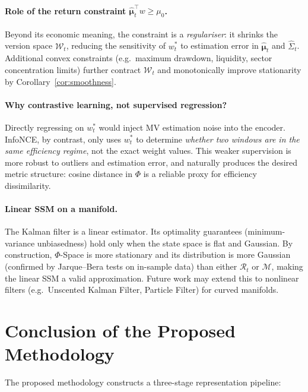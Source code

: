 \documentclass[12pt, a4paper]{report}
\theoremstyle{plain}
\theoremstyle{definition}
\newcommand{\calM}{\mathcal{M}}
\newcommand{\calR}{\mathcal{R}}
\newcommand{\calW}{\mathcal{W}}
\newcommand{\bmu}{\bm{\mu}}
\begin{document}
\paragraph{Role of the return constraint $\hat{\bmu}_t^\top w \ge \mu_0$.}
Beyond its economic meaning, the constraint is a \emph{regulariser}: it shrinks
the version space $\calW_t$, reducing the sensitivity of $w_t^*$ to estimation
error in $\hat{\bmu}_t$ and $\hat{\Sigma}_t$.  Additional convex constraints
(e.g.\ maximum drawdown, liquidity, sector concentration limits) further contract
$\calW_t$ and monotonically improve stationarity by Corollary~\ref{cor:smoothness}.

\paragraph{Why contrastive learning, not supervised regression?}
Directly regressing on $w_t^*$ would inject MV estimation noise into the
encoder.  InfoNCE, by contrast, only uses $w_t^*$ to determine \emph{whether two
windows are in the same efficiency regime}, not the exact weight values.  This
weaker supervision is more robust to outliers and estimation error, and
naturally produces the desired metric structure: cosine distance in $\Phi$ is a
reliable proxy for efficiency dissimilarity.

\paragraph{Linear SSM on a manifold.}
The Kalman filter is a linear estimator.  Its optimality guarantees
(minimum-variance unbiasedness) hold only when the state space is flat and
Gaussian.  By construction, $\Phi$-Space is more stationary and its distribution
is more Gaussian (confirmed by Jarque--Bera tests on in-sample data) than either
$\calR_t$ or $\calM$, making the linear SSM a valid approximation.  Future work
may extend this to nonlinear filters (e.g.\ Unscented Kalman Filter, Particle
Filter) for curved manifolds.

\section{Conclusion of the Proposed Methodology}
\label{sec:conclusion}

The proposed methodology constructs a three-stage representation pipeline:
\end{document}
